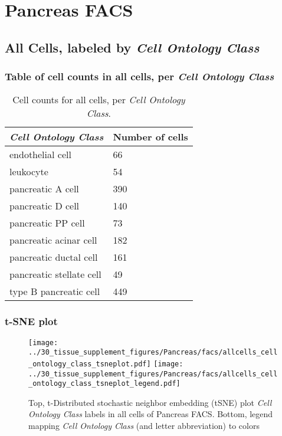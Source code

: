 \clearpage
\section{Pancreas FACS}

\subsection{All Cells, labeled by \emph{Cell Ontology Class}}
\subsubsection{Table of cell counts in all cells, per \emph{Cell Ontology Class}}\begin{table}[h]
\centering
\label{my-label}
\begin{tabular}{@{}ll@{}}
\toprule

\emph{Cell Ontology Class}& Number of cells \\ \midrule
endothelial cell & 66 \\

leukocyte & 54 \\

pancreatic A cell & 390 \\

pancreatic D cell & 140 \\

pancreatic PP cell & 73 \\

pancreatic acinar cell & 182 \\

pancreatic ductal cell & 161 \\

pancreatic stellate cell & 49 \\

type B pancreatic cell & 449 \\
\bottomrule
\end{tabular}
\caption{Cell counts for all cells, per \emph{Cell Ontology Class}.}
\end{table}

\clearpage
\subsubsection{t-SNE plot}
\begin{figure}[h]
\centering
\texttt{[image: ../30\_tissue\_supplement\_figures/Pancreas/facs/allcells\_cell\_ontology\_class\_tsneplot.pdf]}
\texttt{[image: ../30\_tissue\_supplement\_figures/Pancreas/facs/allcells\_cell\_ontology\_class\_tsneplot\_legend.pdf]}
\caption{Top, t-Distributed stochastic neighbor embedding (tSNE) plot  \emph{Cell Ontology Class} labels in all cells of Pancreas FACS. Bottom, legend mapping \emph{Cell Ontology Class} (and letter abbreviation) to colors}
\end{figure}


